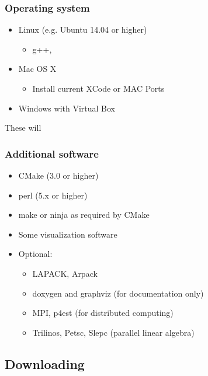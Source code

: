 \begin{frame}
  \frametitle{Operating system}
  \begin{itemize}
  \item Linux (e.g. Ubuntu 14.04 or higher)
    \begin{itemize}
    \item g++, 
    \end{itemize}
  \item Mac OS X
    \begin{itemize}
    \item Install current XCode or MAC Ports
    \end{itemize}
  \item Windows with Virtual Box
  \end{itemize}
  These will 
\end{frame}

\begin{frame}
  \frametitle{Additional software}
  \begin{itemize}
  \item CMake (3.0 or higher)
  \item perl (5.x or higher)
  \item make or ninja as required by CMake
  \item Some visualization software
    \item Optional: 
    \begin{itemize}
    \item LAPACK, Arpack
    \item doxygen and graphviz (for documentation only)
    \item MPI, p4est (for distributed computing)
    \item Trilinos, Petsc, Slepc (parallel linear algebra)
    \end{itemize}
  \end{itemize}
\end{frame}

\subsection{Downloading}

